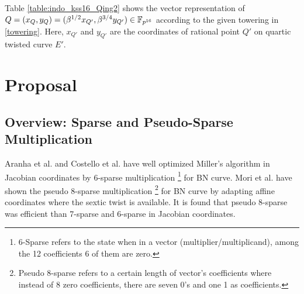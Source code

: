 Table \ref{table:indo_kss16_Qing2} shows the vector representation of $Q = (x_{Q},y_Q) = (\beta^{1/2}x_{Q'},\beta^{3/4}y_{Q'}) \in \mathbb{F}_{p^{16}}$ according to the given towering in \eqref{towering}. Here, $x_{Q'}$ and $y_{Q'}$ are the coordinates of rational point $Q'$ on quartic twisted curve $E'$. 
\renewcommand{\baselinestretch}{1.5}
\begin{table*}[ht]
	\caption{Vector representation of $Q = (x_Q,y_Q) \in \g2 \subset E(\mathbb{F}_{p^{16}})$.}
	\label{table:indo_kss16_Qing2}
	\centering
\end{table*}
\renewcommand{\baselinestretch}{1.0}
\section{Proposal}

\subsection{Overview: Sparse and Pseudo-Sparse Multiplication}
Aranha et al. \cite[Section 4]{EC:AKLGL11} and Costello et al. \cite{PKC:CosLanNae10} have  well optimized Miller's algorithm in Jacobian coordinates by 6-sparse multiplication \footnote{\label{6sparse}{6-Sparse refers to the state when in a vector (multiplier/multiplicand), among the 12 coefficients 6 of them are zero.}} for BN curve. 
Mori et al. \cite{PAIRING:MANS13} have shown the pseudo  8-sparse multiplication \footnote{\label{pseudo8sparse}{Pseudo 8-sparse refers to a certain length of vector's coefficients where instead of 8 zero coefficients, there are seven  0's and one 1 as coefficients.}} for BN curve by adapting affine coordinates where the sextic twist is available. 
It is found that pseudo 8-sparse was efficient than 7-sparse and 6-sparse in Jacobian coordinates. 

